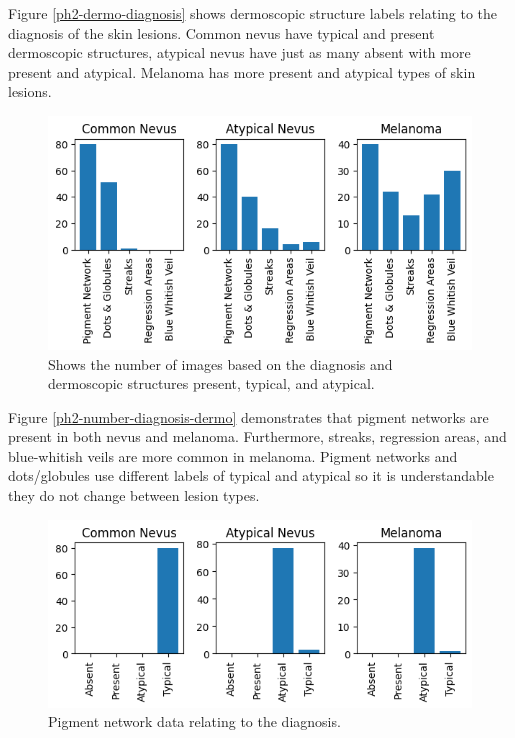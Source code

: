 Figure \ref{ph2-dermo-diagnosis} shows dermoscopic structure labels relating to the diagnosis of the skin lesions. Common nevus have typical and present dermoscopic structures, atypical nevus have just as many absent with more present and atypical. Melanoma has more present and atypical types of skin lesions. 

\begin{figure}
	\centering
	\includegraphics[scale=0.8]{images/ph2/ph2-number-diagnosis-dermo.png}
	\caption{Shows the number of images based on the diagnosis and dermoscopic structures present, typical, and atypical.} 
\end{figure} \label{ph2-number-diagnosis-dermo}

Figure \ref{ph2-number-diagnosis-dermo} demonstrates that pigment networks are present in both nevus and melanoma. Furthermore, streaks, regression areas, and blue-whitish veils are more common in melanoma. Pigment networks and dots/globules use different labels of typical and atypical so it is understandable they do not change between lesion types.

\begin{figure}
	\centering
	\includegraphics[scale=0.8]{images/ph2/ph2-pigment-diagnosis.png}
	\caption{Pigment network data relating to the diagnosis.} 
\end{figure} \label{ph2-number-diagnosis-dermo}


